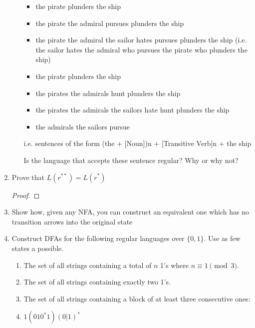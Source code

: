 \documentclass{article}
\begin{document}
\begin{enumerate}
\begin{enumerate}
        \begin{itemize}
            \item[] the pirate plunders the ship

            \item[] the pirate the admiral pursues plunders the ship

            \item[] the pirate the admiral the sailor hates pursues plunders the ship (i.e. the sailor hates the admiral who pursues the pirate who plunders the ship)

            \item[] the pirate plunders the ship

            \item[] the pirates the admirals hunt plunders the ship

            \item[] the pirates the admirals the sailors hate hunt plunders the ship

            \item[] the admirals the sailors pursue
        \end{itemize}
        i.e. sentences of the form (the + [Noun])n + [Transitive Verb]n + the ship

        Is the language that accepts these sentence regular? Why or why not?
    \end{enumerate}

    \item Prove that $L(r^{**})=L(r^* )$
        \begin{proof} 
            
        \end{proof}

    \item Show how, given any NFA, you can construct an equivalent one which has no transition arrows into the original state
    \item Construct DFAs for the following regular languages over $\{0,1\} $. Use as few states a possible.
    \begin{enumerate}
        \item The set of all strings containing a total of $n$ 1's where $n\equiv 1\pmod{3} $.
        \item The set of all strings containing exactly two 1's.
        \item The set of all strings containing a block of at least three consecutive ones: 
        \item $1(010^*1)(0|1)^*$

    \end{enumerate} 
\end{enumerate}
\end{document}
